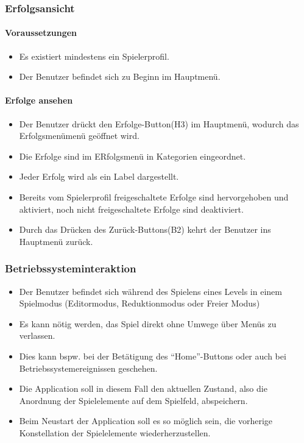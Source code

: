 \subsubsection{Erfolgsansicht}
\paragraph{Voraussetzungen}
\begin{itemize}
	\item Es existiert mindestens ein Spielerprofil.
	\item Der Benutzer befindet sich zu Beginn im Hauptmenü.
\end{itemize}
\paragraph{Erfolge ansehen}
\begin{itemize}
	\item Der Benutzer drückt den Erfolge-Button(H3) im Hauptmenü, wodurch das Erfolgsmenümenü geöffnet wird.
	\item Die Erfolge sind im ERfolgsmenü in Kategorien eingeordnet.
	\item Jeder Erfolg wird als ein Label dargestellt.
	\item Bereits vom Spielerprofil freigeschaltete Erfolge sind hervorgehoben und aktiviert, noch nicht freigeschaltete Erfolge sind deaktiviert.
	\item Durch das Drücken des Zurück-Buttons(B2) kehrt der Benutzer ins Hauptmenü zurück.
\end{itemize}


\subsubsection{Betriebssysteminteraktion}
\begin{itemize}
	\item Der Benutzer befindet sich während des Spielens eines Levels in einem Spielmodus (Editormodus, Reduktionmodus oder Freier Modus) %
	\item Es kann nötig werden, das Spiel direkt ohne Umwege über Menüs zu verlassen.
	\item Dies kann bspw. bei der Betätigung des "`Home"'-Buttons  oder auch bei Betriebssystemereignissen geschehen.
	\item Die Application soll in diesem Fall den aktuellen Zustand, also die Anordnung der Spielelemente auf dem Spielfeld, abspeichern.
	\item Beim Neustart der Application soll es so möglich sein, die vorherige Konstellation der Spielelemente wiederherzustellen.
\end{itemize}

